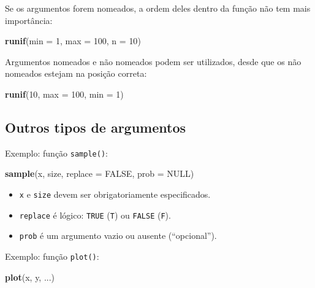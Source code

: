 \documentclass[10pt,a4paper]{book}
\newenvironment{Shaded}{\begin{snugshade}}{\end{snugshade}}
\newcommand{\KeywordTok}[1]{\textcolor[rgb]{0.13,0.29,0.53}{\textbf{#1}}}
\newcommand{\DataTypeTok}[1]{\textcolor[rgb]{0.13,0.29,0.53}{#1}}
\newcommand{\DecValTok}[1]{\textcolor[rgb]{0.00,0.00,0.81}{#1}}
\newcommand{\OtherTok}[1]{\textcolor[rgb]{0.56,0.35,0.01}{#1}}
\newcommand{\NormalTok}[1]{#1}
\providecommand{\tightlist}{%
  \setlength{\itemsep}{0pt}\setlength{\parskip}{0pt}}
\begin{document}
Se os argumentos forem nomeados, a ordem deles dentro da função não tem
mais importância:

\begin{Shaded}
\begin{Highlighting}[]
\KeywordTok{runif}\NormalTok{(}\DataTypeTok{min =} \DecValTok{1}\NormalTok{, }\DataTypeTok{max =} \DecValTok{100}\NormalTok{, }\DataTypeTok{n =} \DecValTok{10}\NormalTok{)}
\end{Highlighting}
\end{Shaded}

Argumentos nomeados e não nomeados podem ser utilizados, desde que os
não nomeados estejam na posição correta:

\begin{Shaded}
\begin{Highlighting}[]
\KeywordTok{runif}\NormalTok{(}\DecValTok{10}\NormalTok{, }\DataTypeTok{max =} \DecValTok{100}\NormalTok{, }\DataTypeTok{min =} \DecValTok{1}\NormalTok{)}
\end{Highlighting}
\end{Shaded}

\subsection{Outros tipos de
argumentos}\label{outros-tipos-de-argumentos}

Exemplo: função \texttt{sample()}:

\begin{Shaded}
\begin{Highlighting}[]
\KeywordTok{sample}\NormalTok{(x, size, }\DataTypeTok{replace =} \OtherTok{FALSE}\NormalTok{, }\DataTypeTok{prob =} \OtherTok{NULL}\NormalTok{)}
\end{Highlighting}
\end{Shaded}

\begin{itemize}
\tightlist
\item
  \texttt{x} e \texttt{size} devem ser obrigatoriamente especificados.
\item
  \texttt{replace} é lógico: \texttt{TRUE} (\texttt{T}) ou
  \texttt{FALSE} (\texttt{F}).
\item
  \texttt{prob} é um argumento vazio ou ausente (``opcional'').
\end{itemize}

Exemplo: função \texttt{plot()}:

\begin{Shaded}
\begin{Highlighting}[]
\KeywordTok{plot}\NormalTok{(x, y, ...)}
\end{Highlighting}
\end{Shaded}
\end{document}
